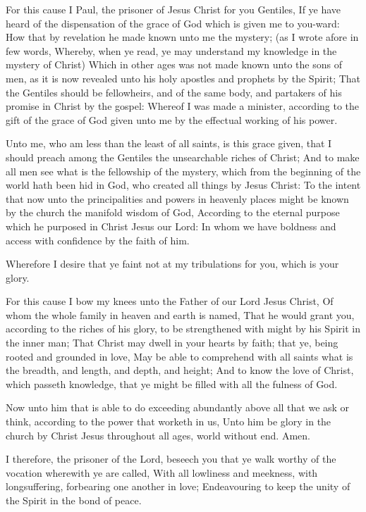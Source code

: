 \Chapter
\Verse For this cause I Paul, the prisoner of Jesus Christ for you Gentiles, \Verse If ye have heard of the dispensation of the grace of God which is given me to you-ward: \Verse How that by revelation he made known unto me the mystery; (as I wrote afore in few words, \Verse Whereby, when ye read, ye may understand my knowledge in the mystery of Christ) \Verse Which in other ages was not made known unto the sons of men, as it is now revealed unto his holy apostles and prophets by the Spirit; \Verse That the Gentiles should be fellowheirs, and of the same body, and partakers of his promise in Christ by the gospel: \Verse Whereof I was made a minister, according to the gift of the grace of God given unto me by the effectual working of his power.

\Verse Unto me, who am less than the least of all saints, is this grace given, that I should preach among the Gentiles the unsearchable riches of Christ; \Verse And to make all men see what is the fellowship of the mystery, which from the beginning of the world hath been hid in God, who created all things by Jesus Christ: \Verse To the intent that now unto the principalities and powers in heavenly places might be known by the church the manifold wisdom of God, \Verse According to the eternal purpose which he purposed in Christ Jesus our Lord: \Verse In whom we have boldness and access with confidence by the faith of him.

\Verse Wherefore I desire that ye faint not at my tribulations for you, which is your glory.

\Verse For this cause I bow my knees unto the Father of our Lord Jesus Christ, \Verse Of whom the whole family in heaven and earth is named, \Verse That he would grant you, according to the riches of his glory, to be strengthened with might by his Spirit in the inner man; \Verse That Christ may dwell in your hearts by faith; that ye, being rooted and grounded in love, \Verse May be able to comprehend with all saints what is the breadth, and length, and depth, and height; \Verse And to know the love of Christ, which passeth knowledge, that ye might be filled with all the fulness of God.

\Verse Now unto him that is able to do exceeding abundantly above all that we ask or think, according to the power that worketh in us, \Verse Unto him be glory in the church by Christ Jesus throughout all ages, world without end. Amen.


\Chapter
\Verse I therefore, the prisoner of the Lord, beseech you that ye walk worthy of the vocation wherewith ye are called, \Verse With all lowliness and meekness, with longsuffering, forbearing one another in love; \Verse Endeavouring to keep the unity of the Spirit in the bond of peace.

